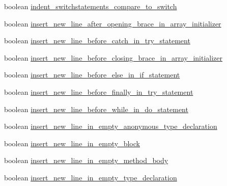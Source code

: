 \begin{DoxyCompactItemize}
boolean \hyperlink{classorg_1_1eclipse_1_1jdt_1_1ui_1_1tests_1_1refactoring_1_1infra_1_1TestFormatterOptions_acd1bd67dd84904acb3a2967bf0b723e6}{indent\_\-switchstatements\_\-compare\_\-to\_\-switch}
\item 
boolean \hyperlink{classorg_1_1eclipse_1_1jdt_1_1ui_1_1tests_1_1refactoring_1_1infra_1_1TestFormatterOptions_a561ba59fcf4a45bdeb34a25f83653562}{insert\_\-new\_\-line\_\-after\_\-opening\_\-brace\_\-in\_\-array\_\-initializer}
\item 
boolean \hyperlink{classorg_1_1eclipse_1_1jdt_1_1ui_1_1tests_1_1refactoring_1_1infra_1_1TestFormatterOptions_a7aa4d1f201ea1ed4744bb551bceb4edb}{insert\_\-new\_\-line\_\-before\_\-catch\_\-in\_\-try\_\-statement}
\item 
boolean \hyperlink{classorg_1_1eclipse_1_1jdt_1_1ui_1_1tests_1_1refactoring_1_1infra_1_1TestFormatterOptions_a5cb40f4a2b2578bfce8c1db7c7618c1a}{insert\_\-new\_\-line\_\-before\_\-closing\_\-brace\_\-in\_\-array\_\-initializer}
\item 
boolean \hyperlink{classorg_1_1eclipse_1_1jdt_1_1ui_1_1tests_1_1refactoring_1_1infra_1_1TestFormatterOptions_ac933c24d7e6d2ac65085b4d439176ec8}{insert\_\-new\_\-line\_\-before\_\-else\_\-in\_\-if\_\-statement}
\item 
boolean \hyperlink{classorg_1_1eclipse_1_1jdt_1_1ui_1_1tests_1_1refactoring_1_1infra_1_1TestFormatterOptions_a816cd1c23add22e44f003159c8391d8d}{insert\_\-new\_\-line\_\-before\_\-finally\_\-in\_\-try\_\-statement}
\item 
boolean \hyperlink{classorg_1_1eclipse_1_1jdt_1_1ui_1_1tests_1_1refactoring_1_1infra_1_1TestFormatterOptions_af14758ca815100064e78ee8fe25a8e4f}{insert\_\-new\_\-line\_\-before\_\-while\_\-in\_\-do\_\-statement}
\item 
boolean \hyperlink{classorg_1_1eclipse_1_1jdt_1_1ui_1_1tests_1_1refactoring_1_1infra_1_1TestFormatterOptions_a64cb4a3ac6ab300b97e1cc9c46892e1b}{insert\_\-new\_\-line\_\-in\_\-empty\_\-anonymous\_\-type\_\-declaration}
\item 
boolean \hyperlink{classorg_1_1eclipse_1_1jdt_1_1ui_1_1tests_1_1refactoring_1_1infra_1_1TestFormatterOptions_adbbaa1c60350e72f137f6a4e6d3fcf51}{insert\_\-new\_\-line\_\-in\_\-empty\_\-block}
\item 
boolean \hyperlink{classorg_1_1eclipse_1_1jdt_1_1ui_1_1tests_1_1refactoring_1_1infra_1_1TestFormatterOptions_a862cac134d61a0740acf30ef661ed1d5}{insert\_\-new\_\-line\_\-in\_\-empty\_\-method\_\-body}
\item 
boolean \hyperlink{classorg_1_1eclipse_1_1jdt_1_1ui_1_1tests_1_1refactoring_1_1infra_1_1TestFormatterOptions_a50333bcfe7b773bfdf21748db00a628e}{insert\_\-new\_\-line\_\-in\_\-empty\_\-type\_\-declaration}

\end{DoxyCompactItemize}
